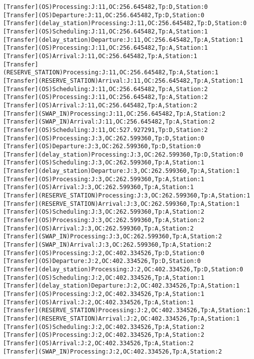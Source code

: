 \documentclass[12pt,a4paper]{article}
\begin{document}
\begin{lstlisting}
[Transfer](OS)Processing:J:11,OC:256.645482,Tp:D,Station:0
[Transfer](OS)Departure:J:11,OC:256.645482,Tp:D,Station:0
[Transfer](delay_station)Processing:J:11,OC:256.645482,Tp:D,Station:0
[Transfer](OS)Scheduling:J:11,OC:256.645482,Tp:A,Station:1
[Transfer](delay_station)Departure:J:11,OC:256.645482,Tp:A,Station:1
[Transfer](OS)Processing:J:11,OC:256.645482,Tp:A,Station:1
[Transfer](OS)Arrival:J:11,OC:256.645482,Tp:A,Station:1
[Transfer](RESERVE_STATION)Processing:J:11,OC:256.645482,Tp:A,Station:1
[Transfer](RESERVE_STATION)Arrival:J:11,OC:256.645482,Tp:A,Station:1
[Transfer](OS)Scheduling:J:11,OC:256.645482,Tp:A,Station:2
[Transfer](OS)Processing:J:11,OC:256.645482,Tp:A,Station:2
[Transfer](OS)Arrival:J:11,OC:256.645482,Tp:A,Station:2
[Transfer](SWAP_IN)Processing:J:11,OC:256.645482,Tp:A,Station:2
[Transfer](SWAP_IN)Arrival:J:11,OC:256.645482,Tp:A,Station:2
[Transfer](OS)Scheduling:J:11,OC:527.927291,Tp:D,Station:2
[Transfer](OS)Processing:J:3,OC:262.599360,Tp:D,Station:0
[Transfer](OS)Departure:J:3,OC:262.599360,Tp:D,Station:0
[Transfer](delay_station)Processing:J:3,OC:262.599360,Tp:D,Station:0
[Transfer](OS)Scheduling:J:3,OC:262.599360,Tp:A,Station:1
[Transfer](delay_station)Departure:J:3,OC:262.599360,Tp:A,Station:1
[Transfer](OS)Processing:J:3,OC:262.599360,Tp:A,Station:1
[Transfer](OS)Arrival:J:3,OC:262.599360,Tp:A,Station:1
[Transfer](RESERVE_STATION)Processing:J:3,OC:262.599360,Tp:A,Station:1
[Transfer](RESERVE_STATION)Arrival:J:3,OC:262.599360,Tp:A,Station:1
[Transfer](OS)Scheduling:J:3,OC:262.599360,Tp:A,Station:2
[Transfer](OS)Processing:J:3,OC:262.599360,Tp:A,Station:2
[Transfer](OS)Arrival:J:3,OC:262.599360,Tp:A,Station:2
[Transfer](SWAP_IN)Processing:J:3,OC:262.599360,Tp:A,Station:2
[Transfer](SWAP_IN)Arrival:J:3,OC:262.599360,Tp:A,Station:2
[Transfer](OS)Processing:J:2,OC:402.334526,Tp:D,Station:0
[Transfer](OS)Departure:J:2,OC:402.334526,Tp:D,Station:0
[Transfer](delay_station)Processing:J:2,OC:402.334526,Tp:D,Station:0
[Transfer](OS)Scheduling:J:2,OC:402.334526,Tp:A,Station:1
[Transfer](delay_station)Departure:J:2,OC:402.334526,Tp:A,Station:1
[Transfer](OS)Processing:J:2,OC:402.334526,Tp:A,Station:1
[Transfer](OS)Arrival:J:2,OC:402.334526,Tp:A,Station:1
[Transfer](RESERVE_STATION)Processing:J:2,OC:402.334526,Tp:A,Station:1
[Transfer](RESERVE_STATION)Arrival:J:2,OC:402.334526,Tp:A,Station:1
[Transfer](OS)Scheduling:J:2,OC:402.334526,Tp:A,Station:2
[Transfer](OS)Processing:J:2,OC:402.334526,Tp:A,Station:2
[Transfer](OS)Arrival:J:2,OC:402.334526,Tp:A,Station:2
[Transfer](SWAP_IN)Processing:J:2,OC:402.334526,Tp:A,Station:2

\end{lstlisting}
\end{document}
